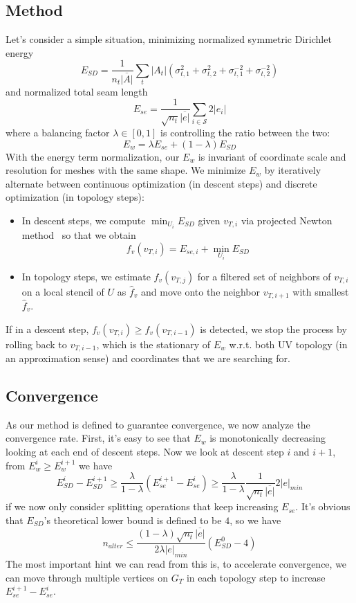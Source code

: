 \subsection{Method}

Let's consider a simple situation, minimizing normalized symmetric Dirichlet energy~\cite{Smith2015Bijective}
\[ E_{SD} = \frac{1}{n_t \overline{|A|}} \sum_t |A_t|(\sigma_{t,1}^2 + \sigma_{t,2}^2 + \sigma_{t,1}^{-2} + \sigma_{t,2}^{-2}) \]
and normalized total seam length
\[ E_{se} = \frac{1}{\sqrt{n_t}\overline{|e|}} \sum_{i \in \mathcal{S}} 2|e_i| \]
where a balancing factor $\lambda \in [0, 1]$ is controlling the ratio between the two: 
\[ E_w = \lambda E_{se} + (1 - \lambda) E_{SD} \]
With the energy term normalization, our $E_w$ is invariant of coordinate scale and resolution for meshes with the same shape.
We minimize $E_w$ by iteratively alternate between continuous optimization (in descent steps) and discrete optimization (in topology steps):
\begin{itemize}
\item In descent steps, we compute $\min_{U_i} E_{SD}$ given $v_{T,i}$ via projected Newton method~\cite{Teran2005Robust} so that we obtain
\[ f_v(v_{T,i}) = E_{se,i} + \min_{U_i} E_{SD} \]
\item In topology steps, we estimate $f_v(v_{T,j})$ for a filtered set of neighbors of $v_{T,i}$ on a local stencil of $U$ as $\hat{f}_v$ and move onto the neighbor $v_{T,i+1}$ with smallest $\hat{f}_v$.
\end{itemize}
If in a descent step, $f_v(v_{T,i}) \geq f_v(v_{T,i-1})$ is detected, we stop the process by rolling back to $v_{T,i-1}$, which is the stationary of $E_w$ w.r.t. both UV topology (in an approximation sense) and coordinates that we are searching for.

\subsection{Convergence}

As our method is defined to guarantee convergence, we now analyze the convergence rate. First, it's easy to see that $E_w$ is monotonically decreasing looking at each end of descent steps. Now we look at descent step $i$ and $i+1$, from $E^i_w \geq E^{i+1}_w$ we have
\[ E^i_{SD} - E^{i+1}_{SD} \geq \frac{\lambda}{1-\lambda} (E^{i+1}_{se} - E^i_{se}) \geq \frac{\lambda}{1-\lambda} \frac{1}{\sqrt{n_t}\overline{|e|}} 2|e|_{min} \]
if we now only consider splitting operations that keep increasing $E_{se}$. It's obvious that $E_{SD}$'s theoretical lower bound is defined to be $4$, so we have
\[ n_{alter} \leq \frac{(1-\lambda)\sqrt{n_t}\overline{|e|}}{2\lambda|e|_{min}} (E^0_{SD} - 4) \]
The most important hint we can read from this is, to accelerate convergence, we can move through multiple vertices on $G_T$ in each topology step to increase $E^{i+1}_{se} - E^i_{se}$. 

